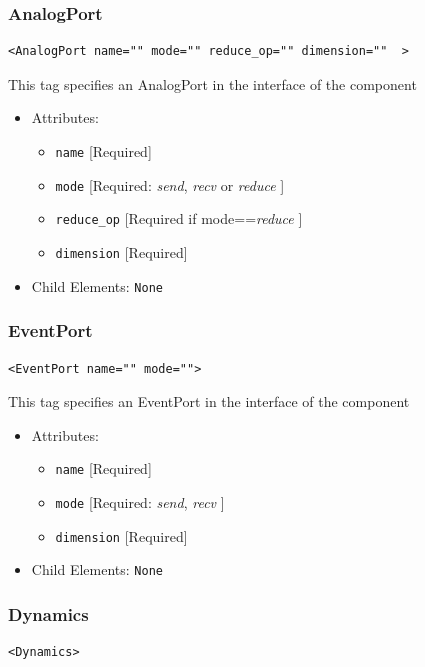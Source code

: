 \documentclass{article}
\begin{document}
\subsubsection{AnalogPort}
%
\begin{lstlisting}
<AnalogPort name="" mode="" reduce_op="" dimension=""  >
\end{lstlisting}

This tag specifies an AnalogPort in the interface of the component

\begin{itemize}
\item Attributes:
%
\begin{itemize}
\item \verb|name| {[}Required{]}
\item \verb|mode| {[}Required: \emph{send}, \emph{recv} or \emph{reduce} {]}
\item \verb|reduce_op| {[}Required if mode==\emph{reduce} {]}
\item \verb|dimension| {[}Required{]}
\end{itemize}

\item Child Elements: \texttt{None}
\end{itemize}

\subsubsection{EventPort}
%
\begin{lstlisting}
<EventPort name="" mode="">
\end{lstlisting}

This tag specifies an EventPort in the interface of the component

\begin{itemize}
\item Attributes:
%
\begin{itemize}
\item \verb|name| {[}Required{]}
\item \verb|mode| {[}Required: \emph{send}, \emph{recv} {]}
\item \verb|dimension| {[}Required{]}
\end{itemize}

\item Child Elements: \texttt{None}
\end{itemize}

\subsubsection{Dynamics}
%
\begin{lstlisting}
<Dynamics>
\end{lstlisting}
\end{document}
